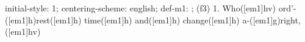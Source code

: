 initial-style: 1;
centering-scheme: english;
def-m1: \grealign;
(f3) 1. Who([em1]hv) ord'-([em1]h)rest([em1]h) time([em1]h) and([em1]h) change([em1]h) a-([em1]g)right,([em1]hv)